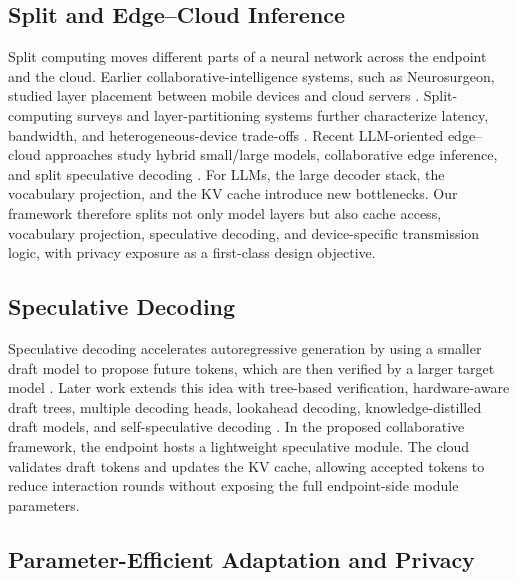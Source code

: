 \documentclass{article}
\begin{document}
\subsection{Split and Edge--Cloud Inference}

Split computing moves different parts of a neural network across the endpoint and the cloud. Earlier collaborative-intelligence systems, such as Neurosurgeon, studied layer placement between mobile devices and cloud servers \cite{kang2017neurosurgeon}. Split-computing surveys and layer-partitioning systems further characterize latency, bandwidth, and heterogeneous-device trade-offs \cite{matsubara2022split,liang2023dnnsurgery,hu2022pipeedge}. Recent LLM-oriented edge--cloud approaches study hybrid small/large models, collaborative edge inference, and split speculative decoding \cite{hao2024hybrid,ye2025jupiter,ning2025dssd,jin2025cecollm,zhang2024edgeshard,li2025survey}. For LLMs, the large decoder stack, the vocabulary projection, and the KV cache introduce new bottlenecks. Our framework therefore splits not only model layers but also cache access, vocabulary projection, speculative decoding, and device-specific transmission logic, with privacy exposure as a first-class design objective.

\subsection{Speculative Decoding}

Speculative decoding accelerates autoregressive generation by using a smaller draft model to propose future tokens, which are then verified by a larger target model \cite{leviathan2023fast,chen2023accelerating}. Later work extends this idea with tree-based verification, hardware-aware draft trees, multiple decoding heads, lookahead decoding, knowledge-distilled draft models, and self-speculative decoding \cite{miao2024specinfer,chen2024sequoia,cai2024medusa,li2024eagle2,fu2024lookahead,zhou2024distillspec,elhoushi2024layerskip,zhang2024draftverify}. In the proposed collaborative framework, the endpoint hosts a lightweight speculative module. The cloud validates draft tokens and updates the KV cache, allowing accepted tokens to reduce interaction rounds without exposing the full endpoint-side module parameters.

\subsection{Parameter-Efficient Adaptation and Privacy}
\end{document}
